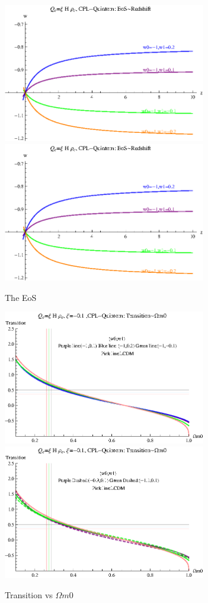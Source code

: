 \documentclass[12pt,a4paper]{article}
\begin{document}
\begin{figure}
\centering
\includegraphics[width=250pt]{rhoc_ICCPL_Quintom_EoS1.eps}
\includegraphics[width=250pt]{rhoc_ICCPL_Quintom_EoS1.eps}
\caption{The EoS}\label{fig-rhoc_ICCPL_Quintom_EoS}
\end{figure}




\begin{figure}
\centering
\includegraphics[width=250pt]{rhoc_ICCPL_Quintom_TransVSOmegam01.eps}
\includegraphics[width=250pt]{rhoc_ICCPL_Quintom_TransVSOmegam02.eps}
\caption{Transition vs $\Omega m0$}\label{fig-rhoc_ICCPL_Quintom_TransVSOmegam0}
\end{figure}
\end{document}
